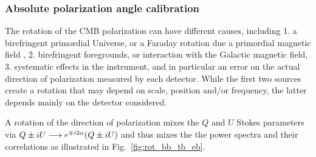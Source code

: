 \documentclass[PICOReport.tex]{subfiles}
\begin{document}
\subsubsection{Absolute polarization angle calibration}
\label{sec:angle}

The rotation of the CMB polarization can have different causes,
including 1. a birefringent primordial Universe, or a Faraday rotation
due a primordial magnetic field \citep{Pogosian+2018}, 2. birefringent
foregrounds, or interaction with the Galactic magnetic field,
3. systematic effects in the instrument, and in particular an error on
the actual direction of polarization measured by each detector.  
While the first two sources create a rotation that may depend on scale,
position and/or frequency, the latter depends mainly on
the detector considered. 

A rotation {\prang} of the direction of polarization mixes the $Q$ and $U$ Stokes parameters via
$Q\pm iU \longrightarrow e^{\mp i 2 \alpha} (Q\pm iU)$
and thus mixes the the power spectra and their correlations as illustrated in Fig.~\ref{fig:rot_bb_tb_eb}.
\end{document}
